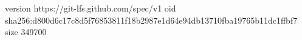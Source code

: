 version https://git-lfs.github.com/spec/v1
oid sha256:d800d6c17c8d5f76853811f18b2987e1d64e94db13710fba19765b11dc1ffbf7
size 349700

